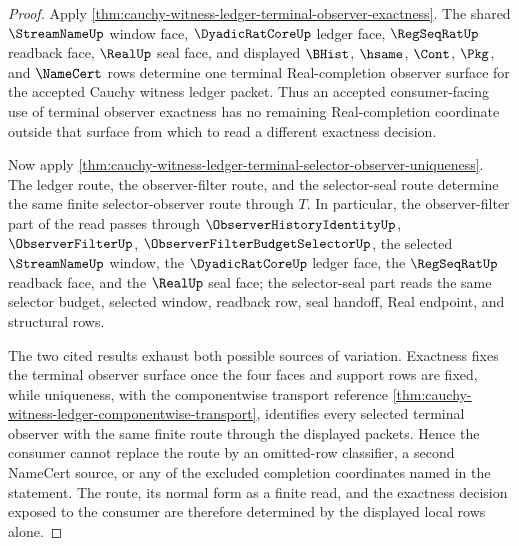 \begin{proof}
Apply \autoref{thm:cauchy-witness-ledger-terminal-observer-exactness}. The shared $\StreamNameUp$ window face, $\DyadicRatCoreUp$ ledger face, $\RegSeqRatUp$ readback face, $\RealUp$ seal face, and displayed $\BHist$, $\hsame$, $\Cont$, $\Pkg$, and $\NameCert$ rows determine one terminal Real-completion observer surface for the accepted Cauchy witness ledger packet. Thus an accepted consumer-facing use of terminal observer exactness has no remaining Real-completion coordinate outside that surface from which to read a different exactness decision.

Now apply \autoref{thm:cauchy-witness-ledger-terminal-selector-observer-uniqueness}. The ledger route, the observer-filter route, and the selector-seal route determine the same finite selector-observer route through $T$. In particular, the observer-filter part of the read passes through $\ObserverHistoryIdentityUp$, $\ObserverFilterUp$, $\ObserverFilterBudgetSelectorUp$, the selected $\StreamNameUp$ window, the $\DyadicRatCoreUp$ ledger face, the $\RegSeqRatUp$ readback face, and the $\RealUp$ seal face; the selector-seal part reads the same selector budget, selected window, readback row, seal handoff, Real endpoint, and structural rows.

The two cited results exhaust both possible sources of variation. Exactness fixes the terminal observer surface once the four faces and support rows are fixed, while uniqueness, with the componentwise transport reference \autoref{thm:cauchy-witness-ledger-componentwise-transport}, identifies every selected terminal observer with the same finite route through the displayed packets. Hence the consumer cannot replace the route by an omitted-row classifier, a second NameCert source, or any of the excluded completion coordinates named in the statement. The route, its normal form as a finite read, and the exactness decision exposed to the consumer are therefore determined by the displayed local rows alone.
\end{proof}
